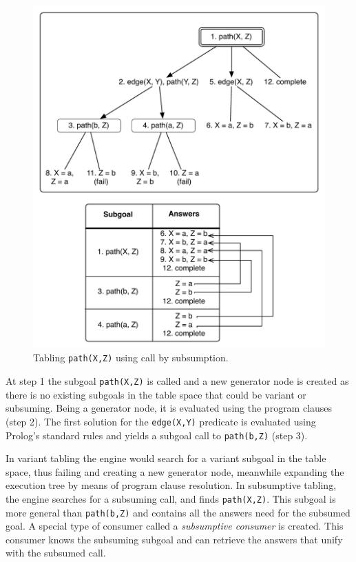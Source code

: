 \begin{figure}[ht]
\centering
  \includegraphics[scale=0.6]{tabling_path_sub.pdf}
\caption{Tabling \texttt{path(X,Z)} using call by subsumption.}
\label{fig:tabling_path_sub}
\end{figure}

At step 1 the subgoal \texttt{path(X,Z)} is called and a new generator node is created as there is no existing subgoals in the table space
that could be variant or subsuming. Being a generator node, it is evaluated using the program clauses (step 2). The first solution
for the \texttt{edge(X,Y)} predicate is evaluated using Prolog's standard rules and yields a subgoal call to \texttt{path(b,Z)} (step 3).

In variant tabling the engine would search for a variant subgoal in the table space, thus failing and creating a new generator node,
meanwhile expanding the execution tree by means of program clause resolution. In subsumptive tabling, the engine searches for a subsuming call,
and finds \texttt{path(X,Z)}. This subgoal
is more general than \texttt{path(b,Z)} and contains all the answers need for the subsumed goal.
A special type of consumer called a \textit{subsumptive consumer} is created. This consumer knows the subsuming subgoal and can retrieve
the answers that unify with the subsumed call.

